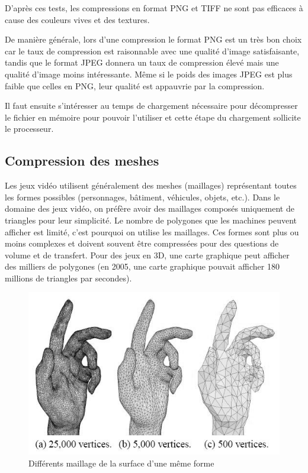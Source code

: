 \documentclass[a4paper, 12pt]{article} %
\begin{document}
D'après ces tests, les compressions en format PNG et TIFF ne sont pas efficaces à cause des couleurs vives et des textures. 

De manière générale, lors d'une compression le format PNG est un très bon choix car le taux de compression est raisonnable avec une qualité d'image satisfaisante, tandis que le format JPEG donnera un taux de compression élevé mais une qualité d'image moins intéressante. Même si le poids des images JPEG est plus faible que celles en PNG, leur qualité est appauvrie par la compression. 

Il faut ensuite s'intéresser au temps de chargement nécessaire pour décompresser le fichier en mémoire pour pouvoir l'utiliser et cette étape du chargement sollicite le processeur.

\subsection{Compression des meshes}
Les jeux vidéo utilisent généralement des meshes (maillages) représentant toutes les formes possibles (personnages, bâtiment, véhicules, objets, etc.). Dans le domaine des jeux vidéo, on préfère avoir des maillages composés uniquement de triangles pour leur simplicité. Le nombre de polygones que les machines peuvent afficher est limité, c'est pourquoi on utilise les maillages. Ces formes sont plus ou moins complexes et doivent souvent être compressées pour des questions de volume et de transfert. Pour des jeux en 3D, une carte graphique peut afficher des milliers de polygones (en 2005, une carte graphique pouvait afficher 180 millions de triangles par secondes)\cite{compression:meshes}.

\begin{figure}[!h]%
\includegraphics[width=\columnwidth]{images/meshes.jpg}%
\caption{Différents maillage de la surface d'une même forme}%
\label{}%
\end{figure}
\end{document}
